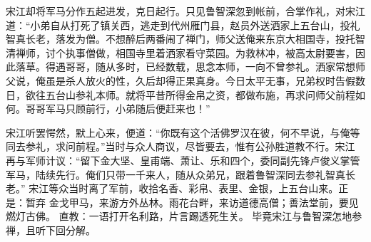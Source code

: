 宋江却将军马分作五起进发，克日起行。只见鲁智深忽到帐前，合掌作礼，对宋江
道：“小弟自从打死了镇关西，逃走到代州雁门县，赵员外送洒家上五台山，投礼
智真长老，落发为僧。不想醉后两番闹了禅门，师父送俺来东京大相国寺，投托智
清禅师，讨个执事僧做，相国寺里着洒家看守菜园。为救林冲，被高太尉要害，因
此落草。得遇哥哥，随从多时，已经数载，思念本师，一向不曾参礼。洒家常想师
父说，俺虽是杀人放火的性，久后却得正果真身。今日太平无事，兄弟权时告假数
日，欲往五台山参礼本师。就将平昔所得金帛之资，都做布施，再求问师父前程如
何。哥哥军马只顾前行，小弟随后便赶来也！”

宋江听罢愕然，默上心来，便道：“你既有这个活佛罗汉在彼，何不早说，与俺等
同去参礼，求问前程。”当时与众人商议，尽皆要去，惟有公孙胜道教不行。宋江
再与军师计议：“留下金大坚、皇甫端、萧让、乐和四个，委同副先锋卢俊义掌管
军马，陆续先行。俺们只带一千来人，随从众弟兄，跟着鲁智深同去参礼智真长老。”
宋江等众当时离了军前，收拾名香、彩帛、表里、金银，上五台山来。正是：暂弃
金戈甲马，来游方外丛林。雨花台畔，来访道德高僧；善法堂前，要见燃灯古佛。
直教：一语打开名利路，片言踢透死生关。
毕竟宋江与鲁智深怎地参禅，且听下回分解。